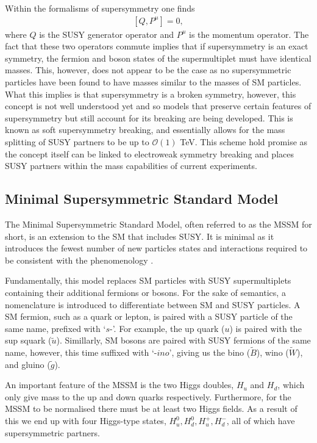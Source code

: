 \documentclass[12pt, oneside]{article}   	%
\begin{document}
Within the formalisms of supersymmetry one finds 
\begin{align}
\left[Q, P^{\mu} \right] = 0,
\end{align}
where $Q$ is the SUSY generator operator and $P^{\mu}$ is the momentum operator.
The fact that these two operators commute implies that if supersymmetry is an exact symmetry, the fermion and boson states of the supermultiplet must have identical masses.
This, however, does not appear to be the case as no supersymmetric particles have been found to have masses similar to the masses of SM particles.
What this implies is that supersymmetry is a broken symmetry, however, this concept is not well understood yet and so models that preserve certain features of supersymmetry but still account for its breaking are being developed. 
This is known as soft supersymmetry breaking, and essentially allows for the mass splitting of SUSY partners to be up to $\mathcal{O}(1)$ TeV.
This scheme hold promise as the concept itself can be linked to electroweak symmetry breaking \cite{chung2005soft} and places SUSY partners within the mass capabilities of current experiments.

\subsection{Minimal Supersymmetric Standard Model} 
The Minimal Supersymmetric Standard Model, often referred to as the MSSM for short, is an extension to the SM that includes SUSY. 
It is minimal as it introduces the fewest number of new particles states and interactions required to be consistent with the phenomenology \cite{baer2006weak}.

Fundamentally, this model replaces SM particles with SUSY supermultiplets containing their additional fermions or bosons. 
For the sake of semantics, a nomenclature is introduced to differentiate between SM and SUSY particles.
A SM fermion, such as a quark or lepton, is paired with a SUSY particle of the same name, prefixed with `$s$-'. 
For example, the up quark ($u$) is paired with the sup squark ($\tilde{u}$).
Simillarly, SM bosons are paired with SUSY fermions of the same name, however, this time suffixed with `-$ino$', giving us the bino ($\tilde{B}$), wino ($\tilde{W}$), and gluino ($\tilde{g}$).

An important feature of the MSSM is the two Higgs doubles, $H_{u}$ and $H_{d}$, which only give mass to the up and down quarks respectively. 
Furthermore, for the MSSM to be normalised there must be at least two Higgs fields.
As a result of this we end up with four Higgs-type states, $H^{0}_{u},  H^{0}_{d}, H^{+}_{u}, H^{-}_{d}$, all of which have supersymmetric partners.
\end{document}
